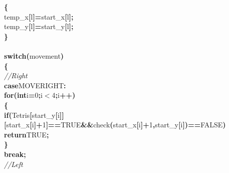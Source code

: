 \documentclass[a4paper, 10pt]{article}
\newcommand\SPC{\hspace*{0.6em}}
\newcommand{\CppAComment}[1]{\textit{\textcolor[rgb]{0.2,0.6,1}{#1}}}
\newcommand{\CppAIdentifier}[1]{#1}
\newcommand{\CppANumber}[1]{\textcolor[rgb]{0.5,0,0.5}{#1}}
\newcommand{\CppAReservedWord}[1]{\textbf{#1}}
\newcommand{\CppASpace}[1]{\colorbox[rgb]{1,1,1}{#1}}
\newcommand{\CppASymbol}[1]{\textbf{\textcolor[rgb]{1,0,0}{#1}}}
\begin{document}
\begin{ttfamily}
\CppASpace{\SPC }\CppASymbol{\{}\\
\CppASpace{\SPC \SPC }\CppAIdentifier{temp\_x}\CppASymbol{[}\CppAIdentifier{l}\CppASymbol{]}\CppASymbol{=}\CppAIdentifier{start\_x}\CppASymbol{[}\CppAIdentifier{l}\CppASymbol{]}\CppASymbol{;}\\
\CppASpace{\SPC \SPC }\CppAIdentifier{temp\_y}\CppASymbol{[}\CppAIdentifier{l}\CppASymbol{]}\CppASymbol{=}\CppAIdentifier{start\_y}\CppASymbol{[}\CppAIdentifier{l}\CppASymbol{]}\CppASymbol{;}\\
\CppASpace{\SPC }\CppASymbol{\}}\\
\\
\CppASpace{\SPC }\CppAReservedWord{switch}\CppASymbol{(}\CppAIdentifier{movement}\CppASymbol{)}\\
\CppASpace{\SPC }\CppASymbol{\{}\\
\CppASpace{\SPC \SPC }\CppAComment{//Right}\\
\CppASpace{\SPC \SPC }\CppAReservedWord{case}\CppASpace{\SPC }\CppAIdentifier{MOVERIGHT}\CppASymbol{:}\\
\CppASpace{\SPC \SPC }\CppAReservedWord{for}\CppASymbol{(}\CppAReservedWord{int}\CppASpace{\SPC }\CppAIdentifier{i}\CppASymbol{=}\CppANumber{0}\CppASymbol{;}\CppAIdentifier{i}\CppASymbol{$<$}\CppANumber{4}\CppASymbol{;}\CppAIdentifier{i}\CppASymbol{++}\CppASymbol{)}\\
\CppASpace{\SPC \SPC }\CppASymbol{\{}\\
\CppASpace{\SPC \SPC \SPC }\CppAReservedWord{if}\CppASymbol{(}\CppAIdentifier{Tetris}\CppASymbol{[}\CppAIdentifier{start\_y}\CppASymbol{[}\CppAIdentifier{i}\CppASymbol{]}\CppASymbol{]}\CppASymbol{[}\CppAIdentifier{start\_x}\CppASymbol{[}\CppAIdentifier{i}\CppASymbol{]}\CppASymbol{+}\CppANumber{1}\CppASymbol{]}\CppASymbol{==}\CppAIdentifier{TRUE}\CppASpace{\SPC }\CppASymbol{\&\&}\CppASpace{\SPC }\CppAIdentifier{check}\CppASymbol{(}\CppAIdentifier{start\_x}\CppASymbol{[}\CppAIdentifier{i}\CppASymbol{]}\CppASymbol{+}\CppANumber{1}\CppASymbol{,}\CppAIdentifier{start\_y}\CppASymbol{[}\CppAIdentifier{i}\CppASymbol{]}\CppASymbol{)}\CppASymbol{==}\CppAIdentifier{FALSE}\CppASymbol{)}\\
\CppASpace{\SPC \SPC \SPC \SPC }\CppAReservedWord{return}\CppASpace{\SPC }\CppAIdentifier{TRUE}\CppASymbol{;}\\
\CppASpace{\SPC \SPC }\CppASymbol{\}}\\
\CppASpace{\SPC \SPC }\CppAReservedWord{break}\CppASymbol{;}\\
\CppASpace{\SPC \SPC }\CppAComment{//Left}\\

\end{ttfamily}
\end{document}
